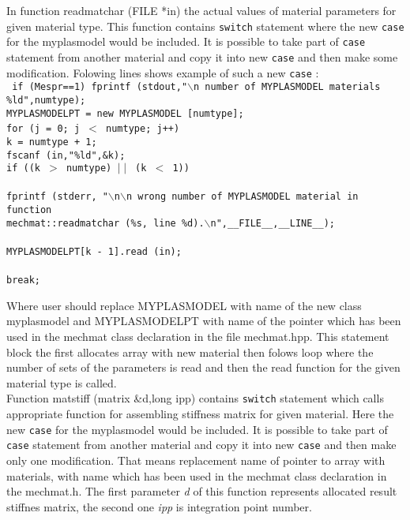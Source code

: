 In function {\sf readmatchar (FILE *in)} the actual values of material parameters for given material type. This function
contains {\tt switch} statement where the new {\tt case} for the  {\sf myplasmodel} would be included.
It is possible to take part of {\tt case} statement from another material and copy it into new {\tt case} and then
make some modification. Folowing lines shows example of such a new {\tt case} :\\
{\tt
      if (Mespr==1)  fprintf (stdout,"$\backslash$n number of MYPLASMODEL materials \%ld",numtype);\\
      MYPLASMODELPT = new MYPLASMODEL [numtype];\\
      for (j = 0; j $<$ numtype; j++){\\
        k = numtype + 1;\\
        fscanf (in,"\%ld",\&k);\\
        if ((k $>$ numtype) $\mid\mid$ (k $<$ 1))\\
        {\\
          fprintf (stderr, "$\backslash$n$\backslash$n wrong number of MYPLASMODEL material in function\\
                   mechmat::readmatchar (\%s, line \%d).$\backslash$n",\_\_FILE\_\_,\_\_LINE\_\_);\\
        }\\
        MYPLASMODELPT[k - 1].read (in);\\
      }\\
      break;\\
}

Where user should replace MYPLASMODEL with name of the new class {\sf myplasmodel} and MYPLASMODELPT with
name of the pointer which has been used in the {\sf mechmat} class declaration in the file mechmat.hpp. This
statement block the first allocates array with new material then folows loop where the number of sets of the
parameters is read and then the {\sf read} function for the given material type is called.\\

Function {\sf matstiff (matrix \&d,long ipp)} contains {\tt switch} statement which calls appropriate function
for assembling stiffness matrix for given material. Here the new {\tt case} for the  {\sf myplasmodel} would be included.
It is possible to take part of {\tt case} statement from another material and copy it into new {\tt case} and then
make only one modification. That means replacement name of pointer to array with materials, with name which has been
used in the {\sf mechmat} class declaration in the mechmat.h. The first parameter {\it d} of this function
represents allocated result stiffnes matrix, the second one {\it ipp} is integration point number.\\

